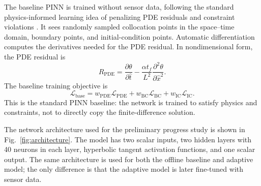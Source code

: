 \documentclass[journal]{new-aiaa}
\begin{document}
The baseline PINN is trained without sensor data, following the standard physics-informed learning idea of penalizing PDE residuals and constraint violations \cite{raissi2019pinn,cai2021heat}. It sees randomly sampled collocation points in the space--time domain, boundary points, and initial-condition points. Automatic differentiation computes the derivatives needed for the PDE residual. In nondimensional form, the PDE residual is
\begin{equation}
R_{\mathrm{PDE}}
= \frac{\partial \theta}{\partial \hat{t}}
- \frac{\alpha t_f}{L^2}
\frac{\partial^2 \theta}{\partial \hat{x}^2}.
\label{eq:pde_residual}
\end{equation}
The baseline training objective is
\begin{equation}
\mathcal{L}_{\mathrm{base}}
= w_{\mathrm{PDE}}\mathcal{L}_{\mathrm{PDE}}
+ w_{\mathrm{BC}}\mathcal{L}_{\mathrm{BC}}
+ w_{\mathrm{IC}}\mathcal{L}_{\mathrm{IC}} .
\end{equation}
This is the standard PINN baseline: the network is trained to satisfy physics and constraints, not to directly copy the finite-difference solution.

The network architecture used for the preliminary progress study is shown in Fig.~\ref{fig:architecture}. The model has two scalar inputs, two hidden layers with 40 neurons in each layer, hyperbolic tangent activation functions, and one scalar output. The same architecture is used for both the offline baseline and adaptive model; the only difference is that the adaptive model is later fine-tuned with sensor data.
\end{document}
